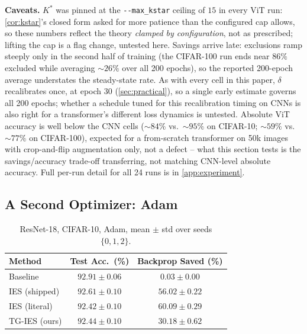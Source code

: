 \documentclass{article}
\newcommand{\lose}[1]{\cellcolor{tglose}#1}
\theoremstyle{plain}
\theoremstyle{definition}
\theoremstyle{remark}
\begin{document}
\textbf{Caveats.} $K^*$ was pinned at the \texttt{-{}-max\_kstar} ceiling of $15$ in every ViT run: \cref{cor:kstar}'s closed form asked for more patience than the configured cap allows, so these numbers reflect the theory \emph{clamped by configuration}, not as prescribed; lifting the cap is a flag change, untested here. Savings arrive late: exclusions ramp steeply only in the second half of training (the CIFAR-100 run ends near $86\%$ excluded while averaging $\sim\!26\%$ over all 200 epochs), so the reported 200-epoch average understates the steady-state rate. As with every cell in this paper, $\delta$ recalibrates once, at epoch 30 (\cref{sec:practical}), so a single early estimate governs all 200 epochs; whether a schedule tuned for this recalibration timing on CNNs is also right for a transformer's different loss dynamics is untested. Absolute ViT accuracy is well below the CNN cells ($\sim\!84\%$ vs.\ $\sim\!95\%$ on CIFAR-10; $\sim\!59\%$ vs.\ $\sim\!77\%$ on CIFAR-100), expected for a from-scratch transformer on 50k images with crop-and-flip augmentation only, not a defect -- what this section tests is the savings/accuracy trade-off transferring, not matching CNN-level absolute accuracy. Full per-run detail for all 24 runs is in \cref{app:experiment}.

\subsection{A Second Optimizer: Adam}
\label{sec:adam}

\begin{table}[h]
\caption{ResNet-18, CIFAR-10, Adam, mean $\pm$ std over seeds $\{0,1,2\}$.}
\label{tab:adam}
\vskip 0.1in
\begin{center}
\begin{small}
\begin{tabular}{lcc}
\toprule
Method & Test Acc.\ (\%) & Backprop Saved (\%) \\
\midrule
Baseline & $92.91\pm0.06$ & $0.03\pm0.00$ \\
IES (shipped) & $92.61\pm0.10$ & $56.02\pm0.22$ \\
IES (literal) & $92.42\pm0.10$ & $\mathbf{60.09\pm0.29}$ \\
\lose{TG-IES (ours)} & \lose{$92.44\pm0.10$} & \lose{$30.18\pm0.62$} \\
\bottomrule
\end{tabular}
\end{small}
\end{center}
\vskip -0.1in
\end{table}
\end{document}
